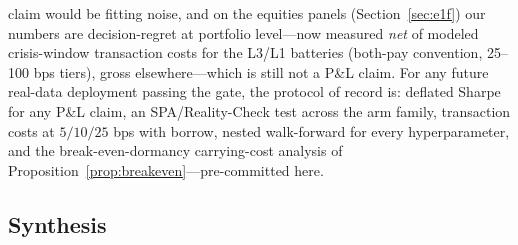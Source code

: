 \documentclass{article}
\begin{document}
claim would be fitting noise, and on the equities panels
(Section~\ref{sec:e1f}) our numbers are decision-regret at portfolio
level---now measured \emph{net} of modeled crisis-window transaction
costs for the L3/L1 batteries (both-pay convention, 25--100 bps
tiers), gross elsewhere---which is still not a P\&L claim. For any future real-data deployment passing the gate, the
protocol of record is: deflated Sharpe \citep{bailey2014deflated} for any
P\&L claim, an SPA/Reality-Check test \citep{hansen2005spa, white2000reality}
across the arm family, transaction costs at $5/10/25$ bps with borrow,
nested walk-forward for every hyperparameter, and the
break-even-dormancy carrying-cost analysis of
Proposition~\ref{prop:breakeven}---pre-committed here.

\subsection{Synthesis}
\end{document}
